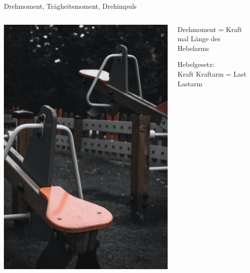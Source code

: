 \documentclass{beamer}
\begin{document}
\begin{frame}{Drehmoment, Trägheitsmoment, Drehimpuls}

\begin{columns}[c]

\begin{column}{5cm}
\includegraphics[width=\textwidth]{wippen.jpg}

\end{column}


\begin{column}{6cm}

Drehmoment = Kraft mal Länge des Hebelarms

Hebelgesetz: \\
Kraft \times Kraftarm = Last \times Lastarm 

\pause


\end{column}
\end{columns}
\end{frame}
\end{document}
